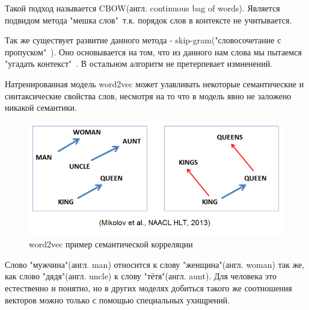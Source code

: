 Такой подход называется CBOW(англ. continuous bag of words). Является подвидом метода "мешка слов"\ т.к. порядок слов в контексте не учитывается. 

Так же существует развитие данного метода - skip-gram\cite{Book28}("словосочетание с пропуском"\ ). Оно основывается на том, что  из данного нам слова мы пытаемся "угадать контекст"\ . В остальном алгоритм не претерпевает измненений.

Натренированная модель word2vec может улавливать некоторые семантические и синтаксические свойства слов, несмотря на то что в модель явно не заложено никакой семантики.
\begin{figure}[!h]
	\centering
	\includegraphics[width=.5\textwidth]{master_img/word2vec_example.png}
	\caption{word2vec пример семантической корреляции\cite{Book28}}
	\label{fig04_master}
\end{figure}
Слово "мужчина"(англ. man) относится к слову "женщина"(англ. woman) так же, как слово "дядя"(англ. uncle) к слову "тётя"(англ. aunt). Для человека это естественно и понятно, но в других моделях добиться такого же соотношения векторов можно только с помощью специальных ухищрений.
